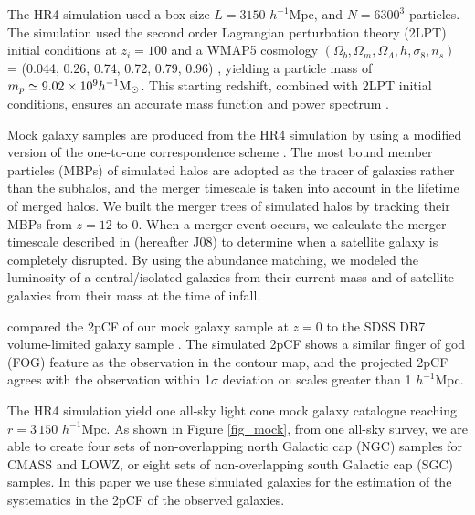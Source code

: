 \documentclass[iop]{emulateapj}
\newcommand{\hMsun}{{\ifmmode{h^{-1}{\rm
        {M_{\odot}}}}\else{$h^{-1}{\rm{M_{\odot}}}$~}\fi}}
\begin{document}
The HR4 simulation  \citep{hr4} used a box size $L={3150}$ $h^{-1}$Mpc, 
and $N=6300^3$ particles.  
The simulation used the second order Lagrangian perturbation theory (2LPT) initial conditions at $z_{i}=100$ and a WMAP5 cosmology
$(\Omega_{b},\Omega_{m},\Omega_\Lambda,h,\sigma_8,n_s)$  = (0.044, 0.26, 0.74, 0.72, 0.79, 0.96) \citep[]{komatsu 2011}, 
yielding a particle mass of $m_{p} \simeq 9.02 \times 10^9 \hMsun$.
This starting redshift, combined  with 2LPT initial conditions, ensures an accurate mass function and power spectrum \citep{2014NewA...30...79L}. 

Mock galaxy samples are produced from the HR4 simulation by using a modified version of the one-to-one correspondence scheme \citep{hong2016}. 
The most bound member particles (MBPs) of simulated halos are adopted as the tracer of galaxies rather than the subhalos,
and the merger timescale is taken into account in the lifetime of merged halos.
We built the merger trees of simulated halos by tracking their MBPs from $z = 12$ to 0.
When a merger event occurs, we calculate the merger timescale described in \cite{jiang2008} (hereafter J08)
to determine when a satellite galaxy is completely disrupted.
By using the abundance matching, 
we modeled the luminosity of a central/isolated galaxies from their current mass
and of satellite galaxies 
from their mass at the time of infall.

\cite{hong2016} compared the 2pCF of our mock galaxy sample at $z = 0$ to the SDSS DR7 volume-limited galaxy sample \citep{zehavi2011}.
The simulated 2pCF shows a similar finger of god (FOG) feature \citep{FOG} as the observation in the contour map, 
and the projected 2pCF agrees with the observation within 1$\sigma$ deviation on scales greater than 1 ${h^{-1}}$Mpc.


The HR4 simulation yield one all-sky light cone mock galaxy catalogue reaching $r=3\,150$ ${h^{-1}}$Mpc.
As shown in Figure \ref{fig_mock},
from one all-sky survey, 
we are able to create four sets of non-overlapping north Galactic cap (NGC) samples for CMASS and LOWZ, 
or eight sets of non-overlapping south Galactic cap (SGC) samples.
In this paper we use these simulated galaxies for the estimation of the systematics in the 2pCF of the observed galaxies.
\end{document}
